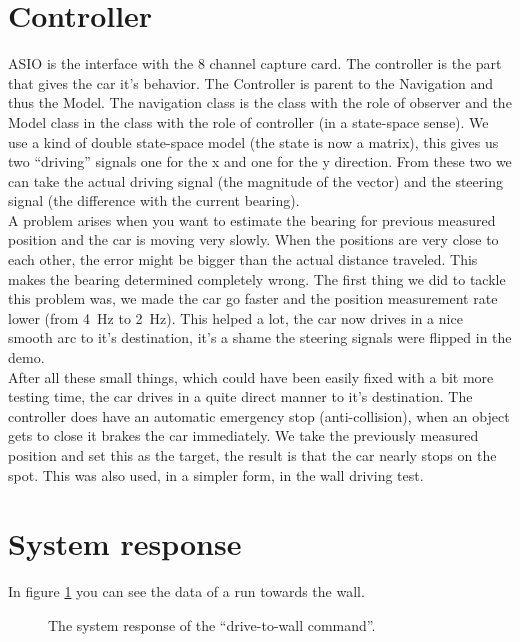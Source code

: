 \documentclass[final]{scrreprt} %
\begin{document}
\section{Controller}
ASIO is the interface with the 8 channel capture card.
The controller is the part that gives the car it's behavior.
The Controller is parent to the Navigation and thus the Model.
The navigation class is the class with the role of observer and the Model class in the class with the role of controller (in a state-space sense).
We use a kind of double state-space model (the state is now a matrix), this gives us two ``driving'' signals one for the x and one for the y direction.
From these two we can take the actual driving signal (the magnitude of the vector) and the steering signal (the difference with the current bearing).\\
A problem arises when you want to estimate the bearing for previous measured position and the car is moving very slowly. 
When the positions are very close to each other, the error might be bigger than the actual distance traveled.
This makes the bearing determined completely wrong.
The first thing we did to tackle this problem was, we made the car go faster and the position measurement rate lower (from \SI{4}{\hertz} to \SI{2}{\hertz}).
This helped a lot, the car now drives in a nice smooth arc to it's destination, it's a shame the steering signals were flipped in the demo.\\
After all these small things, which could have been easily fixed with a bit more testing time, the car drives in a quite direct manner to it's destination.
The controller does have an automatic emergency stop (anti-collision), when an object gets to close it brakes the car immediately.
We take the previously measured position and set this as the target, the result is that the car nearly stops on the spot.
This was also used, in a simpler form, in the wall driving test.


\section{System response}
In figure \ref{fig:system-response} you can see the data of a run towards the wall.
\begin{figure}[H]
	\centering
    	\setlength\figureheight{4cm}
    	\setlength{}
    	    	
    	\caption{The system response of the “drive-to-wall command”.}
    	\label{fig:system-response}
\end{figure}
\end{document}
